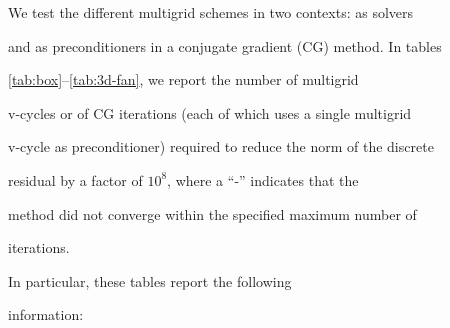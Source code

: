\documentclass[smallcondensed,final]{svjour3}     %
\begin{document}
We test the different multigrid schemes in two contexts: as solvers

and as preconditioners in a conjugate gradient (CG) method.  In tables

\ref{tab:box}--\ref{tab:3d-fan}, we report the number of multigrid

v-cycles or of CG iterations (each of which uses a single multigrid

v-cycle as preconditioner) required to reduce the norm of the discrete

residual by a factor of $10^8$, where a ``-'' indicates that the

method did not converge within the specified maximum number of

iterations.

In particular, these tables report the following

information:
\end{document}
